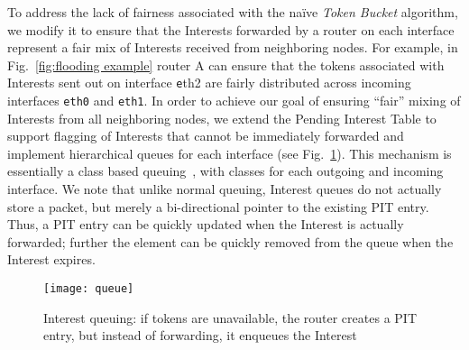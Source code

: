 To address the lack of fairness associated with the na\"ive {\it Token Bucket} algorithm, we modify it to ensure that the Interests forwarded by a router on each interface represent a fair mix of Interests received from neighboring nodes. For example, in Fig.~\ref{fig:flooding example} router A can ensure that the tokens associated with Interests sent out on interface {\texttt eth2}  are fairly distributed across incoming interfaces \texttt{eth0} and \texttt{eth1}. 
In order to achieve our goal of ensuring ``fair'' mixing of Interests from all neighboring nodes, 
we extend the Pending Interest Table to support flagging of Interests that cannot be immediately forwarded and implement hierarchical queues for each interface (see Fig.~\ref{fig:queueing}). 
This mechanism is essentially a class based queuing~\cite{floyd1995link}, with classes for each outgoing and incoming interface.
We note that unlike normal queuing, Interest queues do not actually store a packet, but merely a bi-directional pointer to the existing PIT entry.
Thus, a PIT entry can be quickly updated when the Interest is actually forwarded; further the element can be quickly removed from the queue when the Interest expires.


\begin{figure}[thb]
  \centering
  \texttt{[image: queue]}
  \vspace{-0.7cm}
  \caption{Interest queuing: if tokens are unavailable, the router creates a PIT entry, but instead of forwarding, it enqueues the Interest}
  \label{fig:queueing}
\end{figure}

